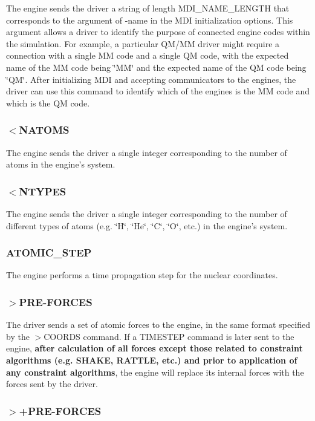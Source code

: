 The engine sends the driver a string of length {\ttfamily M\-D\-I\-\_\-\-N\-A\-M\-E\-\_\-\-L\-E\-N\-G\-T\-H} that corresponds to the argument of {\ttfamily -\/name} in the M\-D\-I initialization options. This argument allows a driver to identify the purpose of connected engine codes within the simulation. For example, a particular Q\-M/\-M\-M driver might require a connection with a single M\-M code and a single Q\-M code, with the expected name of the M\-M code being \char`\"{}\-M\-M\char`\"{} and the expected name of the Q\-M code being \char`\"{}\-Q\-M\char`\"{}. After initializing M\-D\-I and accepting communicators to the engines, the driver can use this command to identify which of the engines is the M\-M code and which is the Q\-M code.\hypertarget{index_recv_natoms}{}\subsubsection{$<$\-N\-A\-T\-O\-M\-S}\label{index_recv_natoms}
The engine sends the driver a single integer corresponding to the number of atoms in the engine's system.\hypertarget{index_recv_types}{}\subsubsection{$<$\-N\-T\-Y\-P\-E\-S}\label{index_recv_types}
The engine sends the driver a single integer corresponding to the number of different types of atoms (e.\-g. \char`\"{}\-H\char`\"{}, \char`\"{}\-He\char`\"{}, \char`\"{}\-C\char`\"{}, \char`\"{}\-O\char`\"{}, etc.) in the engine's system.\hypertarget{index_nuclear_step}{}\subsubsection{A\-T\-O\-M\-I\-C\-\_\-\-S\-T\-E\-P}\label{index_nuclear_step}
The engine performs a time propagation step for the nuclear coordinates.\hypertarget{index_send_preforces}{}\subsubsection{$>$\-P\-R\-E-\/\-F\-O\-R\-C\-E\-S}\label{index_send_preforces}
The driver sends a set of atomic forces to the engine, in the same format specified by the {\ttfamily $>$C\-O\-O\-R\-D\-S} command. If a {\ttfamily T\-I\-M\-E\-S\-T\-E\-P} command is later sent to the engine, {\bfseries  after calculation of all forces except those related to constraint algorithms (e.\-g. S\-H\-A\-K\-E, R\-A\-T\-T\-L\-E, etc.) and prior to application of any constraint algorithms}, the engine will replace its internal forces with the forces sent by the driver.\hypertarget{index_send_add_preforces}{}\subsubsection{$>$+\-P\-R\-E-\/\-F\-O\-R\-C\-E\-S}\label{index_send_add_preforces}
